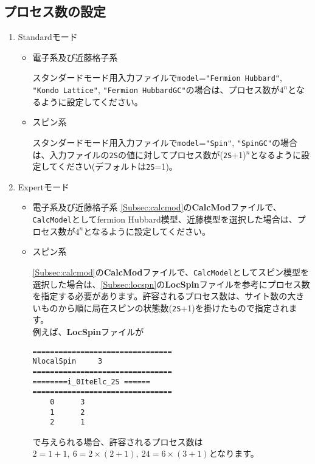 \newpage
\subsection{プロセス数の設定}
\label{SetProcess}
\begin{enumerate}
\item{Standardモード}

\begin{itemize}
\item{電子系及び近藤格子系 }

スタンダードモード用入力ファイルで\verb|model|=\verb|"Fermion Hubbard"|, \\
\verb|"Kondo Lattice"|, \verb|"Fermion HubbardGC"|の場合は、プロセス数が$4^n$となるように設定してください。

\item{スピン系}

スタンダードモード用入力ファイルで\verb|model|=\verb|"Spin"|, \verb|"SpinGC"|の場合は、入力ファイルの\verb|2S|の値に対してプロセス数が(\verb|2S|+1)${}^n$となるように設定してください(デフォルトは\verb|2S|=1)。
\end{itemize}
\item{Expertモード}

\begin{itemize}
\item{電子系及び近藤格子系 }
\ref{Subsec:calcmod}の{\bf CalcMod}ファイルで、\verb|CalcModel|としてfermion Hubbard模型、近藤模型を選択した場合は、プロセス数が$4^n$となるように設定してください。

\item{スピン系 }

\ref{Subsec:calcmod}の{\bf CalcMod}ファイルで、\verb|CalcModel|としてスピン模型を選択した場合は、\ref{Subsec:locspn}の{\bf LocSpin}ファイルを参考にプロセス数を指定する必要があります。許容されるプロセス数は、サイト数の大きいものから順に局在スピンの状態数(\verb|2S|+1)を掛けたもので指定されます。\\
例えば、{\bf LocSpin}ファイルが

\begin{minipage}{10cm}
\begin{screen}
\begin{verbatim}
================================ 
NlocalSpin     3
================================ 
========i_0IteElc_2S ====== 
================================ 
    0      3
    1      2
    2      1
\end{verbatim}
\end{screen}
\end{minipage}

で与えられる場合、許容されるプロセス数は$2=1+1,~6=2\times(2+1),~24=6\times(3+1)$となります。

\end{itemize}

\end{enumerate}

